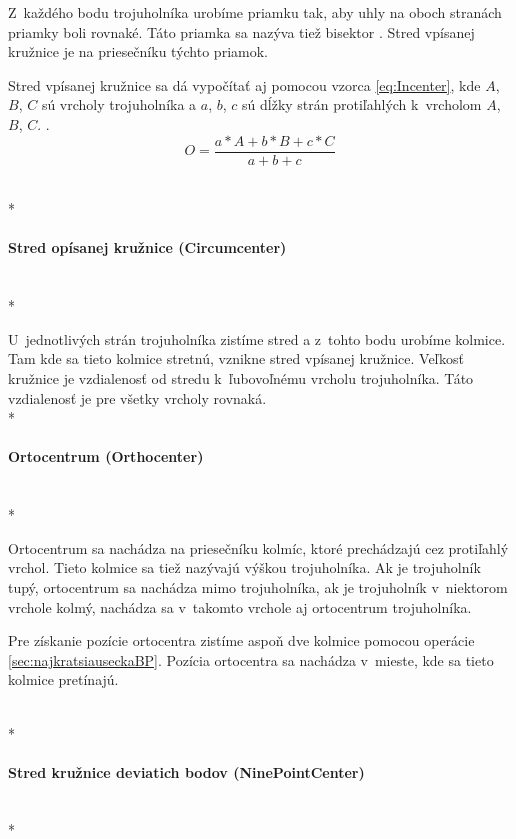 Z~každého bodu trojuholníka urobíme priamku tak, aby uhly na oboch stranách priam\-ky boli rovnaké. Táto priamka sa nazýva tiež bisektor \cite{angle_bisector_theorem}. Stred vpísanej kružnice je na priesečníku týchto priamok.




Stred vpísanej kružnice sa dá vypočítať aj pomocou vzorca \ref{eq:Incenter}, kde  $A$, $B$, $C$ sú vrcholy trojuholníka a $a$, $b$, $c$ sú dĺžky strán protiľahlých k~vrcholom $A$, $B$, $C$. \cite{Incenter_page_2011}.
\begin{equation}
O = \frac{a\ast A+b\ast  B +c \ast C}{a + b + c}
    \label{eq:Incenter}
\end{equation}


 \mbox{} \\*
\paragraph{Stred opísanej kružnice (Circumcenter)}\unskip \mbox{} \\*

U~jednotlivých strán trojuholníka zistíme stred a z~tohto bodu urobíme kolmice. Tam kde sa tieto kolmice stretnú, vznikne stred vpísanej kružnice. Veľkosť kružnice je vzdialenosť od stredu k~ľubovoľnému vrcholu trojuholníka. Táto vzdialenosť je pre všetky vrcholy rovnaká.
 \mbox{} \\*

\paragraph{Ortocentrum (Orthocenter)}\unskip \mbox{} \\*

Ortocentrum sa nachádza na priesečníku kolmíc, ktoré prechádzajú cez protiľahlý vrchol. Tieto kolmice sa tiež nazývajú výškou trojuholníka. 
Ak je trojuholník tupý, ortocentrum sa nachádza mimo trojuholníka, ak je trojuholník v~niektorom vrchole kolmý, nachádza sa v~takomto vrchole aj ortocentrum trojuholníka.

Pre získanie pozície ortocentra zistíme aspoň dve kolmice pomocou operácie \ref{sec:najkratsiauseckaBP}. Pozícia ortocentra sa nachádza v~mieste, kde sa tieto kolmice pretínajú. 


 \mbox{} \\*
\paragraph{Stred kružnice deviatich bodov (NinePointCenter)}\unskip \mbox{} \\*


